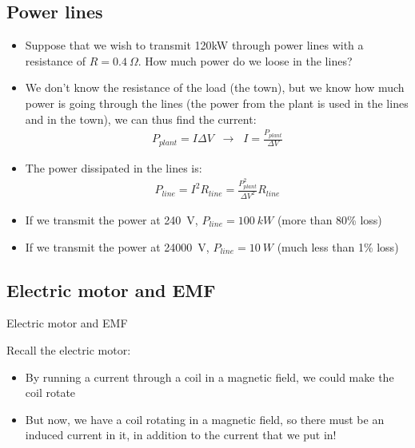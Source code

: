 \documentclass[aspectratio=169,
hyperref={colorlinks,urlcolor=blue}
]{beamer}
\begin{document}



\subsection{Power lines}
\label{subsec:powerlines}
{\scriptsize
\begin{itemize}
\item Suppose that we wish to transmit 120kW through power lines with a resistance of $R=\SI{0.4}{\Omega}$. How much power do we loose in the lines?
\item We don't know the resistance of the load (the town), but we know how much power is going through the lines (the power from the plant is used in the lines and in the town), we can thus find the current:
\begin{align*}
P_{plant}=I\Delta V\;\;\rightarrow\;\; I=\frac{P_{plant}}{\Delta V}
\end{align*}
\item The power dissipated in the lines is:
\begin{align*}
P_{line}=I^2R_{line}=\frac{P^2_{plant}}{\Delta V^2}R_{line}
\end{align*}
\item If we transmit the power at \SI{240}{V}, $P_{line}=\SI{100}{kW}$ (more than 80\% loss)
\item If we transmit the power at \SI{24000}{V}, $P_{line}=\SI{10}{W}$  (much less than 1\% loss)
\end{itemize}
}
{
}



\subsection{Electric motor and EMF}
\label{subsec:electricmotorandemf}
\begin{bulletframe}{Electric motor and EMF}
\item Recall the electric motor:
\begin{itemize}
\item By running a current through a coil in a magnetic field, we could make the coil rotate
\item But now, we have a coil rotating in a magnetic field, so there must be an induced current in it, in addition to the current that we put in!
\end{itemize}
\end{bulletframe}
\end{document}
